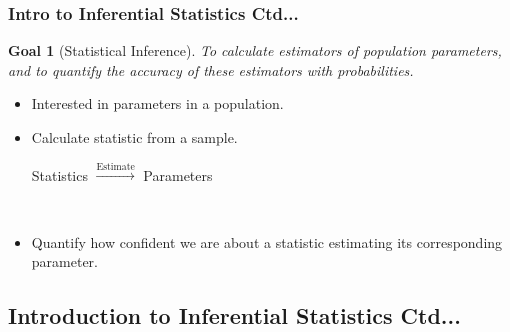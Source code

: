 \documentclass[xcolor=svgnames, compress]{beamer}
\newtheorem{goal}{Goal}
\begin{document}
\begin{frame}
\frametitle{Intro to Inferential Statistics Ctd...} 

\begin{goal}[Statistical Inference]
\justifying
To calculate estimators of population parameters, and to quantify the accuracy of these
estimators with probabilities.
\end{goal}


\vspace{0.10cm}


\begin{itemize}\justifying
\item	Interested in parameters in a population.\\[0.50em]
\item	Calculate statistic from a sample.
\vspace{0.25cm}
\hfill\\
	\begin{center}
	Statistics	 \quad	$\xrightarrow{\text{Estimate}}$	 \quad Parameters
	\end{center}
\hfill\\
\item	Quantify how confident we are about a statistic estimating its corresponding parameter.
\end{itemize}

\end{frame}




\subsection*{Introduction to Inferential Statistics Ctd...}
\end{document}
